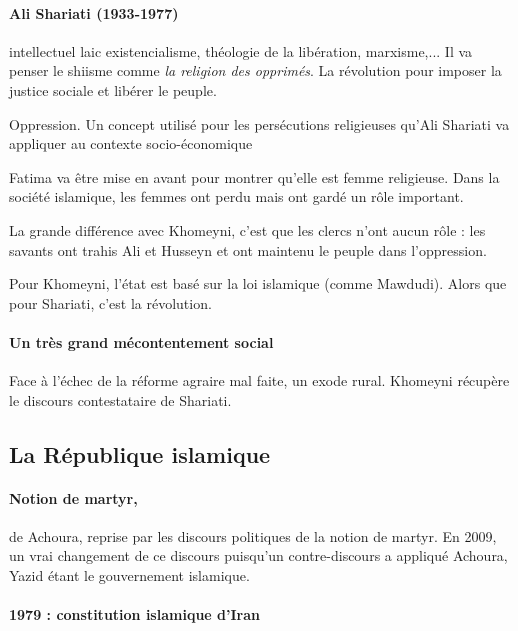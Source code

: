    \paragraph{Ali Shariati (1933-1977)} intellectuel laic  existencialisme, théologie de la libération, marxisme,...
   Il va penser le shiisme comme \textit{la religion des opprimés}. La révolution pour imposer la justice sociale et libérer le peuple.
   \begin{Def}
   Oppression. Un concept utilisé pour les persécutions religieuses qu'Ali Shariati va appliquer au contexte socio-économique
   \end{Def}
   Fatima va être mise en avant pour montrer qu'elle est femme religieuse. Dans la société islamique, les femmes ont perdu mais ont gardé un rôle important.
   
   La grande différence avec Khomeyni, c'est que les clercs n'ont aucun rôle : les savants ont trahis Ali et Husseyn et ont maintenu le peuple dans l'oppression.
   
   Pour Khomeyni, l'état est basé sur la loi islamique (comme Mawdudi). Alors que pour Shariati, c'est la révolution.
   
   \paragraph{Un très grand mécontentement social} Face à l'échec de la réforme agraire mal faite, un exode rural. Khomeyni récupère le discours contestataire de Shariati. 
   

   
 \subsection{La République islamique}
     
     
\paragraph{Notion de martyr,} de Achoura, reprise par les discours politiques de la notion de martyr. 
   En 2009, un vrai changement de ce discours puisqu'un contre-discours a appliqué Achoura,  Yazid étant le gouvernement islamique.
   
   
\paragraph{1979 : constitution islamique d'Iran}   
    
